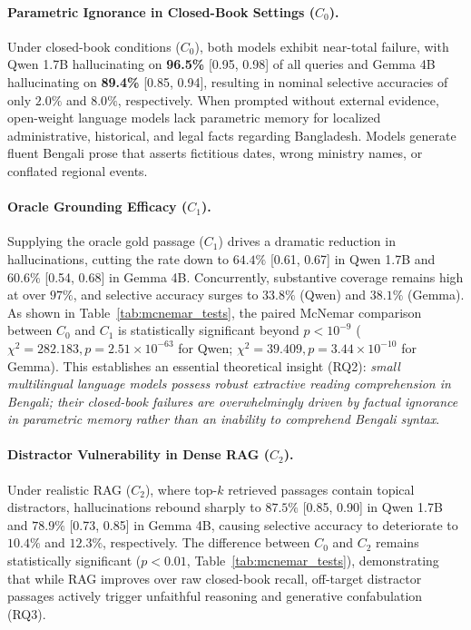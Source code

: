 \documentclass[11pt,a4paper,twocolumn]{article}
\begin{document}
\paragraph{Parametric Ignorance in Closed-Book Settings ($C_0$).}
Under closed-book conditions ($C_0$), both models exhibit near-total failure, with Qwen 1.7B hallucinating on \textbf{96.5\%} [0.95, 0.98] of all queries and Gemma 4B hallucinating on \textbf{89.4\%} [0.85, 0.94], resulting in nominal selective accuracies of only $2.0\%$ and $8.0\%$, respectively. When prompted without external evidence, open-weight language models lack parametric memory for localized administrative, historical, and legal facts regarding Bangladesh. Models generate fluent Bengali prose that asserts fictitious dates, wrong ministry names, or conflated regional events.

\paragraph{Oracle Grounding Efficacy ($C_1$).}
Supplying the oracle gold passage ($C_1$) drives a dramatic reduction in hallucinations, cutting the rate down to $64.4\%$ [0.61, 0.67] in Qwen 1.7B and $60.6\%$ [0.54, 0.68] in Gemma 4B. Concurrently, substantive coverage remains high at over $97\%$, and selective accuracy surges to $33.8\%$ (Qwen) and $38.1\%$ (Gemma). As shown in Table~\ref{tab:mcnemar_tests}, the paired McNemar comparison between $C_0$ and $C_1$ is statistically significant beyond $p < 10^{-9}$ ($\chi^2 = 282.183, p = 2.51 \times 10^{-63}$ for Qwen; $\chi^2 = 39.409, p = 3.44 \times 10^{-10}$ for Gemma). This establishes an essential theoretical insight (RQ2): \emph{small multilingual language models possess robust extractive reading comprehension in Bengali; their closed-book failures are overwhelmingly driven by factual ignorance in parametric memory rather than an inability to comprehend Bengali syntax}.

\paragraph{Distractor Vulnerability in Dense RAG ($C_2$).}
Under realistic RAG ($C_2$), where top-$k$ retrieved passages contain topical distractors, hallucinations rebound sharply to $87.5\%$ [0.85, 0.90] in Qwen 1.7B and $78.9\%$ [0.73, 0.85] in Gemma 4B, causing selective accuracy to deteriorate to $10.4\%$ and $12.3\%$, respectively. The difference between $C_0$ and $C_2$ remains statistically significant ($p < 0.01$, Table~\ref{tab:mcnemar_tests}), demonstrating that while RAG improves over raw closed-book recall, off-target distractor passages actively trigger unfaithful reasoning and generative confabulation (RQ3).
\end{document}
